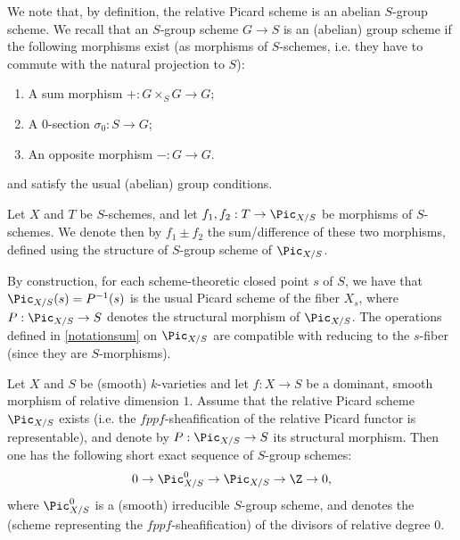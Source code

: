 We note that, by definition, the relative Picard scheme is an abelian $S$-group scheme. We recall that an $S$-group scheme $G \rightarrow S$ is an (abelian) group scheme if the following morphisms exist (as morphisms of $S$-schemes, i.e. they have to commute with the natural projection to $S$):
\begin{enumerate}
	\item A sum morphism $+:G \times_S G \rightarrow G$;
	\item A $0$-section $\sigma_0:S \rightarrow G$;
	\item An opposite morphism $-:G \rightarrow G$.
\end{enumerate}
and satisfy the usual (abelian) group conditions.


\begin{notation}\label{notationsum}
	Let $X$ and $T$ be $S$-schemes, and let $f_1,f_2:T \rightarrow \Pic_{X/S}$ be morphisms of $S$-schemes. We denote then by $f_1\pm f_2$ the sum/difference of these two morphisms, defined using the structure of $S$-group scheme of $\Pic_{X/S}$.
\end{notation}


\begin{remark}\label{fiberwise}
	By construction, for each scheme-theoretic closed point $s$ of $S$, we have that $\Pic_{X/S}(s)=P^{-1}(s)$ is the usual Picard scheme of the fiber $X_s$, where $P:\Pic_{X/S}\rightarrow S$ denotes the structural morphism of $\Pic_{X/S}$. The operations defined in \ref{notationsum} on $\Pic_{X/S}$ are compatible with reducing to the $s$-fiber (since they are $S$-morphisms).
\end{remark}

\begin{proposition}\label{smoothrelativedimension1}
	Let $X$ and $S$ be (smooth) $k$-varieties and let $f:X \rightarrow S$ be a dominant, smooth morphism of relative dimension $1$. Assume that the relative Picard scheme $\Pic_{X/S}$ exists (i.e. the $fppf$-sheafification of the relative Picard functor is representable), and denote by $P:\Pic_{X/S} \rightarrow S$ its structural morphism. Then one has the following short exact sequence of $S$-group schemes:
	\begin{equation}\label{SES}
		0 \rightarrow \Pic^0_{X/S} \rightarrow \Pic_{X/S} \rightarrow \Z \rightarrow 0,
	\end{equation}
	where $\Pic^0_{X/S}$ is a (smooth) irreducible $S$-group scheme, and denotes the (scheme representing the $fppf$-sheafification) of the divisors of relative degree $0$.
\end{proposition}


